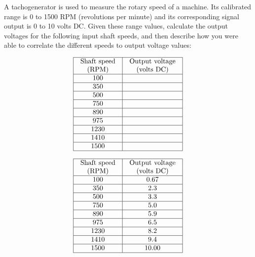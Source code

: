 

A tachogenerator is used to measure the rotary speed of a machine.  Its calibrated range is 0 to 1500 RPM (revolutions per minute) and its corresponding signal output is 0 to 10 volts DC.  Given these range values, calculate the output voltages for the following input shaft speeds, and then describe how you were able to correlate the different speeds to output voltage values:


$$\vbox{\offinterlineskip
\halign{\strut
\vrule \quad\hfil # \ \hfil & 
\vrule \quad\hfil # \ \hfil \vrule \cr
\noalign{\hrule}
%
Shaft speed & Output voltage \cr
%
(RPM) & (volts DC) \cr
%
\noalign{\hrule}
%
100 &  \cr
%
\noalign{\hrule}
%
350 &  \cr
%
\noalign{\hrule}
%
500 &  \cr
%
\noalign{\hrule}
%
750 &  \cr
%
\noalign{\hrule}
%
890 &  \cr
%
\noalign{\hrule}
%
975 &  \cr
%
\noalign{\hrule}
%
1230 &  \cr
%
\noalign{\hrule}
%
1410 &  \cr
%
\noalign{\hrule}
%
1500 &  \cr
%
\noalign{\hrule}
} %
}$$ %








$$\vbox{\offinterlineskip
\halign{\strut
\vrule \quad\hfil # \ \hfil & 
\vrule \quad\hfil # \ \hfil \vrule \cr
\noalign{\hrule}
%
Shaft speed & Output voltage \cr
%
(RPM) & (volts DC) \cr
%
\noalign{\hrule}
%
100 & 0.67 \cr
%
\noalign{\hrule}
%
350 & 2.3 \cr
%
\noalign{\hrule}
%
500 & 3.3 \cr
%
\noalign{\hrule}
%
750 & 5.0 \cr
%
\noalign{\hrule}
%
890 & 5.9 \cr
%
\noalign{\hrule}
%
975 & 6.5 \cr
%
\noalign{\hrule}
%
1230 & 8.2 \cr
%
\noalign{\hrule}
%
1410 & 9.4 \cr
%
\noalign{\hrule}
%
1500 & 10.00 \cr
%
\noalign{\hrule}
} %
}$$ %


